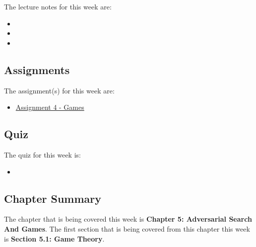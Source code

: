 \noindent The lecture notes for this week are:

\begin{itemize}
    \item {}
    \item {}
    \item {}
\end{itemize}

\subsection{Assignments}

The assignment(s) for this week are:

\begin{itemize}
    \item \href{https://github.com/QuantumCompiler/CU/tree/main/CSPB%203202%20-%20Introduction%20To%20Artificial%20Intelligence/Assignments/Assignment%204%20-%20Games}{Assignment 4 - Games}
\end{itemize}

\subsection{Quiz}

The quiz for this week is:

\begin{itemize}
    \item {}
\end{itemize}

\newpage

\subsection{Chapter Summary}

The chapter that is being covered this week is \textbf{Chapter 5: Adversarial Search And Games}. The first section that is being covered from this chapter this week is \textbf{Section 5.1: Game Theory}.

